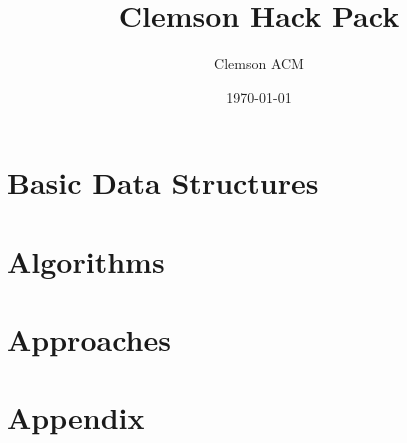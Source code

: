 \documentclass[letterpaper, 10pt]{report}
\title{Clemson Hack Pack}
\author{Clemson ACM}
\date{\today}
\begin{document}
\maketitle



\tableofcontents

\chapter{Basic Data Structures}




\chapter{Algorithms}



\chapter{Approaches}



\chapter{Appendix}







\printindex
\end{document}
